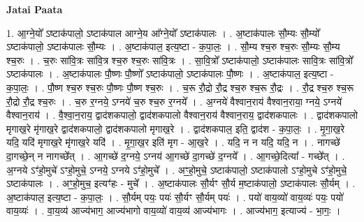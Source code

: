 \documentclass[17pt]{extarticle}
\begin{document}
\textbf{Jatai Paata} \newline

1. आ॒ग्ने॒यो᳚ ऽष्टाक॑पालो॒ ऽष्टाक॑पाल आग्ने॒य आ᳚ग्ने॒यो᳚ ऽष्टाक॑पालः । . अ॒ष्टाक॑पालः सौ॒म्यः सौ॒म्यो᳚ ऽष्टाक॑पालो॒ ऽष्टाक॑पालः सौ॒म्यः । . अ॒ष्टाक॑पाल॒ इत्य॒ष्टा - क॒पा॒लः॒ । . सौ॒म्य श्च॒रु श्च॒रुः सौ॒म्यः सौ॒म्य श्च॒रुः । . च॒रुः सा॑वि॒त्रः सा॑वि॒त्र श्च॒रु श्च॒रुः सा॑वि॒त्रः । . सा॒वि॒त्रो᳚ ऽष्टाक॑पालो॒ ऽष्टाक॑पालः सावि॒त्रः सा॑वि॒त्रो᳚ ऽष्टाक॑पालः । . अ॒ष्टाक॑पालः पौ॒ष्णः पौ॒ष्णो᳚ ऽष्टाक॑पालो॒ ऽष्टाक॑पालः पौ॒ष्णः । . अ॒ष्टाक॑पाल॒ इत्य॒ष्टा - क॒पा॒लः॒ । . पौ॒ष्ण श्च॒रु श्च॒रुः पौ॒ष्णः पौ॒ष्ण श्च॒रुः । . च॒रू रौ॒द्रो रौ॒द्र श्च॒रु श्च॒रू रौ॒द्रः । . रौ॒द्र श्च॒रु श्च॒रू रौ॒द्रो रौ॒द्र श्च॒रुः । . च॒रु र॒ग्नये॒ ऽग्नये॑ च॒रु श्च॒रु र॒ग्नये᳚ । . अ॒ग्नये॑ वैश्वान॒राय॑ वैश्वान॒राया॒ ग्नये॒ ऽग्नये॑ वैश्वान॒राय॑ । . वै॒श्वा॒न॒राय॒ द्वाद॑शकपालो॒ द्वाद॑शकपालो वैश्वान॒राय॑ वैश्वान॒राय॒ द्वाद॑शकपालः । . द्वाद॑शकपालो मृगाख॒रे मृ॑गाख॒रे द्वाद॑शकपालो॒ द्वाद॑शकपालो मृगाख॒रे । . द्वाद॑शकपाल॒ इति॒ द्वाद॑श - क॒पा॒लः॒ । . मृ॒गा॒ख॒रे यदि॒ यदि॑ मृगाख॒रे मृ॑गाख॒रे यदि॑ । . मृ॒गा॒ख॒र इति॑ मृग - आ॒ख॒रे । . यदि॒ न न यदि॒ यदि॒ न । . नागच्छे॑ दा॒गच्छे॒न् न नागच्छे᳚त् । . आ॒गच्छे॑ द॒ग्नये॒ ऽग्नय॑ आ॒गच्छे॑ दा॒गच्छे॑ द॒ग्नये᳚ । . आ॒गच्छे॒दित्या᳚ - गच्छे᳚त् । . अ॒ग्नये ऽꣳ॑हो॒मुचे॑ ऽꣳहो॒मुचे॒ ऽग्नये॒ ऽग्नये ऽꣳ॑हो॒मुचे᳚ । . अꣳ॒॒हो॒मुचे॒ ऽष्टाक॑पालो॒ ऽष्टाक॑पालो ऽꣳहो॒मुचे ऽꣳ॑हो॒मुचे॒ ऽष्टाक॑पालः । . अꣳ॒॒हो॒मुच॒ इत्यꣳ॑हः - मुचे᳚ । . अ॒ष्टाक॑पालः सौ॒र्यꣳ सौ॒र्य म॒ष्टाक॑पालो॒ ऽष्टाक॑पालः सौ॒र्यम् । . अ॒ष्टाक॑पाल॒ इत्य॒ष्टा - क॒पा॒लः॒ । . सौ॒र्यम् पयः॒ पयः॑ सौ॒र्यꣳ सौ॒र्यम् पयः॑ । . पयो॑ वाय॒व्यो॑ वाय॒व्यः॑ पयः॒ पयो॑ वाय॒व्यः॑ । . वा॒य॒व्य॑ आज्य॑भाग॒ आज्य॑भागो वाय॒व्यो॑ वाय॒व्य॑ आज्य॑भागः । . आज्य॑भाग॒ इत्याज्य॑ - भा॒गः॒ । \newline
\end{document}
